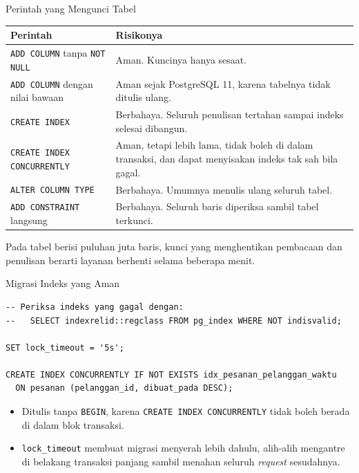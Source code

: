 \documentclass[aspectratio=169, table, 12pt]{beamer}
\begin{document}
\begin{frame}{{\Large Perintah yang Mengunci Tabel}}
  \vspace{5pt}
  {\centering
  {\footnotesize
  \begin{tabularx}{\textwidth}{lX}
    \hline
    \textbf{Perintah} & \textbf{Risikonya} \\
    \hline
    \texttt{ADD COLUMN} tanpa \texttt{NOT NULL} & Aman. Kuncinya hanya sesaat. \\
    \hline
    \texttt{ADD COLUMN} dengan nilai bawaan & Aman sejak PostgreSQL 11, karena tabelnya tidak ditulis ulang. \\
    \hline
    \texttt{CREATE INDEX} & Berbahaya. Seluruh penulisan tertahan sampai indeks selesai dibangun. \\
    \hline
    \texttt{CREATE INDEX CONCURRENTLY} & Aman, tetapi lebih lama, tidak boleh di dalam transaksi, dan dapat menyisakan indeks tak sah bila gagal. \\
    \hline
    \texttt{ALTER COLUMN TYPE} & Berbahaya. Umumnya menulis ulang seluruh tabel. \\
    \hline
    \texttt{ADD CONSTRAINT} langsung & Berbahaya. Seluruh baris diperiksa sambil tabel terkunci. \\
    \hline
  \end{tabularx}}\par}

  \vspace{8pt}
  {\footnotesize Pada tabel berisi puluhan juta baris, kunci yang
  menghentikan pembacaan dan penulisan berarti layanan berhenti selama
  beberapa menit.}
\end{frame}

\begin{frame}[fragile]{{\Large Migrasi Indeks yang Aman}}
  \vspace{2pt}
\begin{lstlisting}[style=SqlStyle]
-- Periksa indeks yang gagal dengan:
--   SELECT indexrelid::regclass FROM pg_index WHERE NOT indisvalid;

SET lock_timeout = '5s';

CREATE INDEX CONCURRENTLY IF NOT EXISTS idx_pesanan_pelanggan_waktu
  ON pesanan (pelanggan_id, dibuat_pada DESC);
\end{lstlisting}

  \vspace{2pt}
  \begin{itemize}
    \item Ditulis tanpa \texttt{BEGIN}, karena \texttt{CREATE INDEX
          CONCURRENTLY} tidak boleh berada di dalam blok transaksi.
    \item \texttt{lock\_timeout} membuat migrasi menyerah lebih dahulu,
          alih-alih mengantre di belakang transaksi panjang sambil menahan
          seluruh \textit{request} sesudahnya.
  \end{itemize}
\end{frame}
\end{document}
